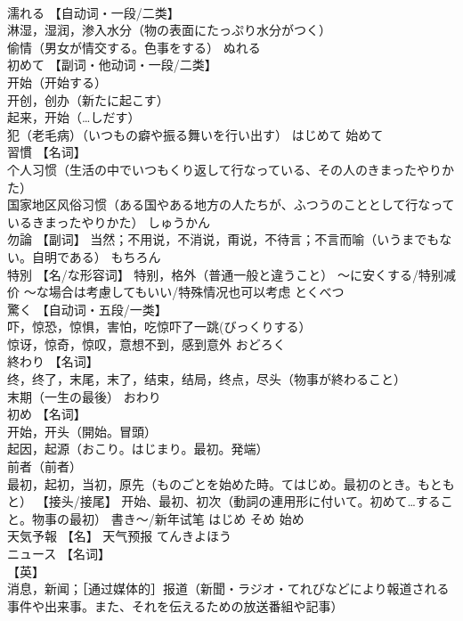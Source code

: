\documentclass[8pt]{extreport}
\begin{document}
\begin{CJK}{UTF8}{min}
\\	濡れる	【自动词・一段/二类】 
\\	淋湿，湿润，渗入水分（物の表面にたっぷり水分がつく） 
\\	偷情（男女が情交する。色事をする）	ぬれる	
\\	初めて	【副词・他动词・一段/二类】 
\\	开始（开始する） 
\\	开创，创办（新たに起こす） 
\\	起来，开始（…しだす） 
\\	犯（老毛病）（いつもの癖や振る舞いを行い出す）	はじめて	始めて
\\	習慣	【名词】 
\\	个人习惯（生活の中でいつもくり返して行なっている、その人のきまったやりかた） 
\\	国家地区风俗习惯（ある国やある地方の人たちが、ふつうのこととして行なっているきまったやりかた）	しゅうかん	
\\	勿論	【副词】 当然；不用说，不消说，甭说，不待言；不言而喻（いうまでもない。自明である）	もちろん	
\\	特別	【名/な形容词】 特别，格外（普通一般と違うこと） 〜に安くする/特别减价 〜な場合は考慮してもいい/特殊情况也可以考虑	とくべつ	
\\	驚く	【自动词・五段/一类】 
\\	吓，惊恐，惊惧，害怕，吃惊吓了一跳(びっくりする） 
\\	惊讶，惊奇，惊叹，意想不到，感到意外	おどろく	
\\	終わり	【名词】 
\\	终，终了，末尾，末了，结束，结局，终点，尽头（物事が終わること） 
\\	末期（一生の最後）	おわり	
\\	初め	【名词】 
\\	开始，开头（開始。冒頭） 
\\	起因，起源（おこり。はじまり。最初。発端） 
\\	前者（前者） 
\\	最初，起初，当初，原先（ものごとを始めた時。てはじめ。最初のとき。もともと） 【接头/接尾】 开始、最初、初次（動詞の連用形に付いて。初めて…すること。物事の最初） 書き～/新年试笔	はじめ そめ	始め
\\	天気予報	【名】 天气预报	てんきよほう	
\\	ニュース	【名词】 
\\	【英】
\\	消息，新闻；［通过媒体的］报道（新聞・ラジオ・てれびなどにより報道される事件や出来事。また、それを伝えるための放送番組や記事） 

\end{CJK}
\end{document}
